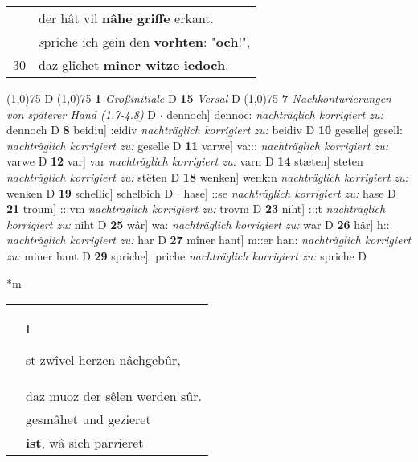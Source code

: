 \documentclass[8pt,a4paper,notitlepage]{article}
\begin{document}
\begin{table}[ht]
\begin{minipage}[t]{0.5\linewidth}
\begin{tabular}{rl}
 & der hât vil \textbf{nâhe griffe} erkant.\\ 
 & \textit{s}priche ich gein den \textbf{vorhten}: "\textbf{och}!",\\ 
30 & daz glîchet \textbf{mîner witze} \textbf{iedoch}.\\ 
\end{tabular}
\scriptsize
\line(1,0){75} \newline
D \newline
\line(1,0){75} \newline
\textbf{1} \textit{Großinitiale} D  \textbf{15} \textit{Versal} D  \newline
\line(1,0){75} \newline
\textbf{7} \textit{Nachkonturierungen von späterer Hand (1.7-4.8)} D   $\cdot$ dennoch] dennoc: \textit{nachträglich korrigiert zu:} dennoch D \textbf{8} beidiu] :eidiv \textit{nachträglich korrigiert zu:} beidiv D \textbf{10} geselle] gesell: \textit{nachträglich korrigiert zu:} geselle D \textbf{11} varwe] va::: \textit{nachträglich korrigiert zu:} varwe D \textbf{12} var] var \textit{nachträglich korrigiert zu:} varn D \textbf{14} stæten] steten \textit{nachträglich korrigiert zu:} stëten D \textbf{18} wenken] wenk:n \textit{nachträglich korrigiert zu:} wenken D \textbf{19} schellic] schelbich D  $\cdot$ hase] ::se \textit{nachträglich korrigiert zu:} hase D \textbf{21} troum] :::vm \textit{nachträglich korrigiert zu:} trovm D \textbf{23} niht] :::t \textit{nachträglich korrigiert zu:} niht D \textbf{25} wâr] wa: \textit{nachträglich korrigiert zu:} war D \textbf{26} hâr] h:: \textit{nachträglich korrigiert zu:} har D \textbf{27} mîner hant] m::er han: \textit{nachträglich korrigiert zu:} miner hant D \textbf{29} spriche] :priche \textit{nachträglich korrigiert zu:} spriche D \newline
\end{minipage}
\hspace{0.5cm}
\begin{minipage}[t]{0.5\linewidth}
\small
\begin{center}*m
\end{center}
\begin{tabular}{rl}
 & \begin{Large}I\end{Large}st zwîvel herzen nâchgebûr,\\ 
 & daz muoz der sêlen werden sûr.\\ 
 & gesmâhet und gezieret\\ 
 & \textbf{ist}, wâ sich par\textit{r}ieret\\ 

\end{tabular}
\end{minipage}
\end{table}
\end{document}
